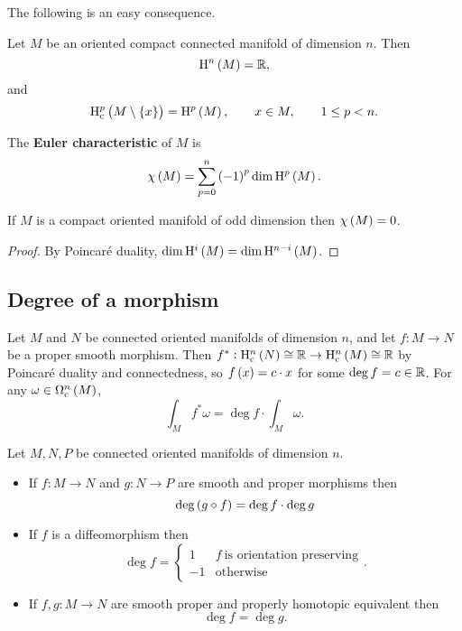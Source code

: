 The following is an easy consequence.

\begin{corollary}
Let $ M $ be an oriented compact connected manifold of dimension $ n $. Then
$$ \H^n\br{M} = \RR, $$
and
$$ \H_\c^p\br{M \setminus \cbr{x}} = \H^p\br{M}, \qquad x \in M, \qquad 1 \le p < n. $$
\end{corollary}

\begin{definition}
The \textbf{Euler characteristic} of $ M $ is
$$ \chi\br{M} = \sum_{p = 0}^n \br{-1}^p \dim \H^p\br{M}. $$
\end{definition}

\begin{corollary}
If $ M $ is a compact oriented manifold of odd dimension then $ \chi\br{M} = 0 $.
\end{corollary}

\begin{proof}
By Poincar\'e duality, $ \dim \H^i\br{M} = \dim \H^{n - i}\br{M} $.
\end{proof}

\pagebreak

\subsection{Degree of a morphism}

Let $ M $ and $ N $ be connected oriented manifolds of dimension $ n $, and let $ f : M \to N $ be a proper smooth morphism. Then $ f^* : \H_\c^n\br{N} \cong \RR \to \H_\c^n\br{M} \cong \RR $ by Poincar\'e duality and connectedness, so $ f\br{x} = c \cdot x $ for some $ \deg f = c \in \mathbb{R} $. For any $ \omega \in \Omega_\c^n\br{M} $,
$$ \int_M f^*\omega = \deg f \cdot \int_M \omega. $$


\begin{proposition}
Let $ M, N, P $ be connected oriented manifolds of dimension $ n $.
\begin{itemize}
\item If $ f : M \to N $ and $ g : N \to P $ are smooth and proper morphisms then
$$ \deg \br{g \circ f} = \deg f \cdot \deg g $$
\item If $ f $ is a diffeomorphism then
$$ \deg f =
\begin{cases}
1 & f \ \text{is orientation preserving} \\
-1 & \text{otherwise}
\end{cases}.
$$
\item If $ f, g : M \to N $ are smooth proper and properly homotopic equivalent then
$$ \deg f = \deg g. $$
\end{itemize}
\end{proposition}

